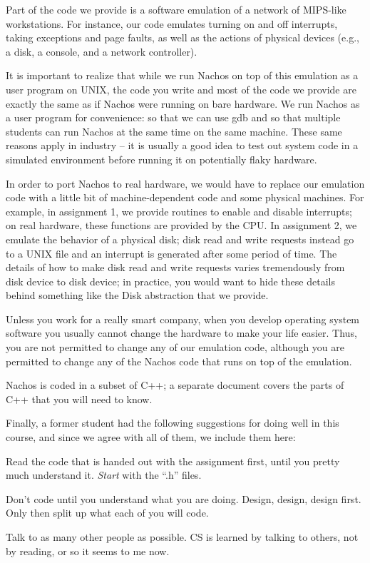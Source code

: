 Part of the code we provide is a software emulation of a network 
of MIPS-like workstations.  For instance, our code emulates turning on 
and off interrupts, taking exceptions and page faults, as well as 
the actions of physical devices (e.g., a disk, a console, and a
network controller).

It is important to realize that while we run Nachos on top of this
emulation as a user program on UNIX, the code you write and most of the code
we provide are exactly the same as if Nachos were running on bare hardware.
We run Nachos as a user program for convenience: so
that we can use gdb and so that multiple students can run Nachos
at the same time on the same machine.  These same reasons apply
in industry -- it is usually a good idea to test out system code
in a simulated environment before running it on potentially flaky hardware.

In order to port Nachos to real hardware, we would have to
replace our emulation code with a little bit of machine-dependent code and
some physical machines.  For example, in assignment 1, we provide
routines to enable and disable interrupts; on real hardware,
these functions are provided by the CPU.
In assignment 2, we emulate the behavior of a physical disk;
disk read and write requests instead go to a UNIX file and an 
interrupt is generated after some period of time.
The details of how to make disk read and write requests varies tremendously
from disk device to disk device; in practice, you would want to hide
these details behind something like the Disk abstraction that we provide.

Unless you work for a really smart company, when you develop
operating system software you usually cannot change the hardware to 
make your life easier.  Thus, you are not permitted to change any of
our emulation code, although you are permitted to change any of
the Nachos code that runs on top of the emulation.

Nachos is coded in a subset of C++; a separate document covers the 
parts of C++ that you will need to know.  

Finally, a former student had the following suggestions for doing well in this
course, and since we agree with all of them, we include them here:

\begin{description}

\item Read the code that is handed out with the assignment first, until 
you pretty much understand it.  {\em Start} with the ``.h'' files.

\item Don't code until you understand what you are doing.  Design, 
design, design first.  Only then split up what each of you will code.

\item Talk to as many other people as possible.  CS is learned by talking 
to others, not by reading, or so it seems to me now.

\end{description}


